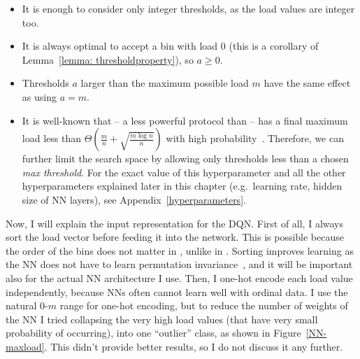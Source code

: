 \begin{itemize}
    \item It is enough to consider only integer thresholds, as the load values are integer too.
    \item It is always optimal to accept a bin with load $0$ (this is a corollary of Lemma~\ref{lemma: thresholdproperty}), so $a\geq 0$.
    \item Thresholds $a$ larger than the maximum possible load $m$ have the same effect as using $a=m$.
    \item It is well-known that \OneChoice -- a less powerful protocol than \TwoThinning -- has a final maximum load less than $\Theta (\frac{m}{n} + \sqrt{\frac{m\log n}{n}})$ with high probability~\cite{raab1998onechoice}. Therefore, we can further limit the search space by allowing only thresholds less than a chosen \textit{max threshold}. For the exact value of this hyperparameter and all the other hyperparameters explained later in this chapter (e.g.\ learning rate, hidden size of NN layers), see Appendix~\ref{hyperparameters}.  
    
\end{itemize}


Now, I will explain the input representation for the DQN. First of all, I always sort the load vector before feeding it into the network. This is possible because the order of the bins does not matter in \TwoThinning, unlike in \GraphicalTwoChoice. Sorting improves learning as the NN does not have to learn permutation invariance~\cite{zaheer2017permutationinvariance}, and it will be important also for the actual NN architecture I use. Then, I one-hot encode each load value independently, because NNs often cannot learn well with ordinal data. I use the natural $0$-$m$ range for one-hot encoding, but to reduce the number of weights of the NN I tried collapsing the very high load values (that have very small probability of occurring), into one ``outlier'' class, as shown in Figure~\ref{NN-maxload}. This didn't provide better results, so I do not discuss it any further.

